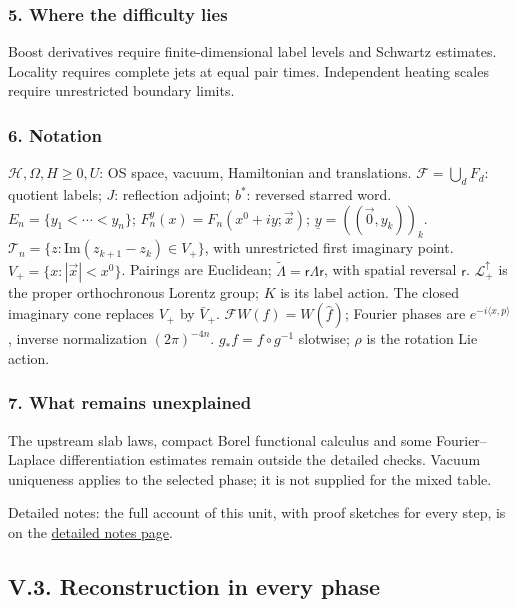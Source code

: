 \documentclass[
  letterpaper,
  11pt]{article}
\begin{document}
\subsubsection{5. Where the difficulty
lies}\label{where-the-difficulty-lies-21}

Boost derivatives require finite-dimensional label levels and Schwartz
estimates. Locality requires complete jets at equal pair times.
Independent heating scales require unrestricted boundary limits.

\subsubsection{6. Notation}\label{notation-21}

\(\mathcal H,\Omega,H\ge0,U\): OS space, vacuum, Hamiltonian and
translations. \(\mathcal F=\bigcup_d F_d\): quotient labels; \(J\):
reflection adjoint; \(b^*\): reversed starred word.
\(E_n=\{y_1<\cdots<y_n\}\); \(F_n^y(x)=F_n(x^0+iy;\vec x)\);
\(\underline y=((\vec0,y_k))_k\).
\(\mathcal T_n=\{z:\mathrm{Im}(z_{k+1}-z_k)\in V_+\}\), with
unrestricted first imaginary point. \(V_+=\{x:|\vec x|<x^0\}\). Pairings
are Euclidean; \(\tilde\Lambda=\mathsf r\Lambda\mathsf r\), with spatial
reversal \(\mathsf r\). \(\mathcal L^\uparrow_+\) is the proper
orthochronous Lorentz group; \(K\) is its label action. The closed
imaginary cone replaces \(V_+\) by \(\bar V_+\).
\(\mathcal FW(f)=W(\hat f)\); Fourier phases are
\(e^{-i\langle x,p\rangle}\), inverse normalization \((2\pi)^{-4n}\).
\(g_*f=f\circ g^{-1}\) slotwise; \(\rho\) is the rotation Lie action.

\subsubsection{7. What remains
unexplained}\label{what-remains-unexplained-21}

The upstream slab laws, compact Borel functional calculus and some
Fourier--Laplace differentiation estimates remain outside the detailed
checks. Vacuum uniqueness applies to the selected phase; it is not
supplied for the mixed table.

Detailed notes: the full account of this unit, with proof sketches for
every step, is on the
\href{https://github.com/scottnarmstrong/yang-mills-informalization/blob/main/outline/notes/V-2.md}{detailed
notes page}.

\subsection{V.3. Reconstruction in every
phase}\label{v.3.-reconstruction-in-every-phase}
\end{document}
